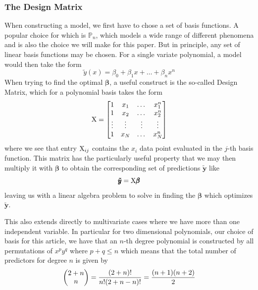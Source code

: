 \documentclass[reprint, english, nofootinbib]{revtex4-2}
\begin{document}
        \subsubsection{The Design Matrix}
            \noindent
            When constructing a model, we first have to chose a set of basis functions. A popular choice for which is $\mathbb P_n$, which models a wide range of different phenomena and is also the choice we will make for this paper. But in principle, any set of linear basis functions may be chosen.
            For a single variate polynomial, a model would then take the form
            \begin{equation}
                \tilde y (x) = \beta_0 + \beta_1 x+ \dots + \beta_n x^n
            \end{equation}
            When trying to find the optimal $\pmb \beta$, a useful construct is the so-called Design Matrix, which for a polynomial basis takes the form
            \begin{equation}
                \textup{X} = \qty[
                \begin{matrix}
                    1 & x_1 & \dots & x_1^n \\
                    1 & x_2 & \dots & x_2^n \\
                    \vdots & \vdots & \vdots & \vdots \\
                    1 & x_N & \dots & x_N^n
                \end{matrix}
                ]
            \end{equation}
            where we see that entry $\textup{X}_{ij}$ contains the $x_i$ data point evaluated in the $j$-th basis function. This matrix has the particularly useful property that we may then multiply it with $\pmb \beta$ to obtain the corresponding set of predictions $\pmb{\tilde y}$ like
            \begin{equation}
                \pmb{\tilde y} = \textup{X}\pmb \beta
            \end{equation}
            leaving us with a linear algebra problem to solve in finding the $\pmb\beta$ which optimizes $\pmb{\tilde y}$.

            This also extends directly to multivariate cases where we have more than one independent variable. In particular for two dimensional polynomials, our choice of basis for this article, we have that an $n$-th degree polynomial is constructed by all permutations of $x^p y^q$ where $p+q \leq n$ which means that the total number of predictors for degree $n$ is given by
            \begin{equation}\label{eqn:number of predictors wrt complexity}
                \qty(
                \begin{matrix}
                    2 + n \\ n
                \end{matrix}
                )
                =\frac{(2+n)!}{n!(2+n-n)!} = \frac{(n+1)(n+2)}{2}
            \end{equation}
\end{document}
